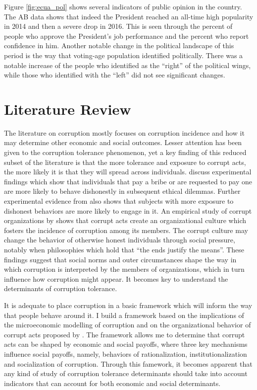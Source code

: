 \documentclass[12pt,a4]{article}\usepackage[]{graphicx}\usepackage[]{xcolor}
\begin{document}
Figure \ref{fig:ecua_pol} shows several indicators of public opinion in the country. The AB data shows that indeed the President reached an all-time high popularity in 2014 and then a severe drop in 2016. This is seen through the percent of people who approve the President's job performance and the percent who report confidence in him. Another notable change in the political landscape of this period is the way that voting-age population identified politically. There was a notable increase of the people who identified as the \enquote{right} of the political wings, while those who identified with the \enquote{left} did not see significant changes.





\section{Literature Review}

The literature on corruption mostly focuses on corruption incidence and how it may determine other economic and social outcomes. Lesser attention has been given to the corruption tolerance phenomenon, yet a key finding of this reduced subset of the literature is that the more tolerance and exposure to corrupt acts, the more likely it is that they will spread across individuals. \textcite{Ariely.2019} discuss experimental findings which show that individuals that pay a bribe or are requested to pay one are more likely to behave dishonestly in subsequent ethical dilemmas. Further experimental evidence from \textcite{Gino.2009} also shows that subjects with more exposure to dishonest behaviors are more likely to engage in it. An empirical study of corrupt organizations by \textcite{Campbell.2014} shows that corrupt acts create an organizational culture which fosters the incidence of corruption among its members. The corrupt culture may change the behavior of otherwise honest individuals through social pressure, notably when philosophies which hold that \enquote{the ends justify the means}. These findings suggest that social norms and outer circumstances shape the way in which corruption is interpreted by the members of organizations, which in turn influence how corruption might appear. It becomes key to understand the determinants of corruption tolerance.

It is adequate to place corruption in a basic framework which will inform the way that people behave around it. I build a framework based on the implications of the microeconomic modelling of corruption and on the organizational behavior of corrupt acts proposed by \textcite{Ashforth.2003}. The framework allows me to determine that corrupt acts can be shaped by economic and social payoffs, where three key mechanisms influence social payoffs, namely, behaviors of rationalization, institutionalization and socialization of corruption. Through this famework, it becomes apparent that any kind of study of corruption tolerance determinants should take into account indicators that can account for both economic and social determinants. 
\end{document}

